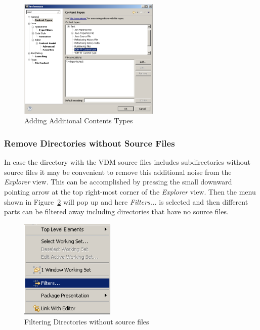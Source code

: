\documentclass{overturerep}
\begin{document}
{\begin{figure}[!htb]
\begin{center}
\includegraphics[width=0.6\textwidth]{screenDumps/contentstypes}
\caption{Adding Additional Contents Types\label{fig:ContentsTypes}}
\end{center}
\end{figure}

\subsubsection{Remove Directories without Source Files}

In case the directory with the VDM source files includes
subdirectories without source files it may be convenient to remove
this additional noise from the \emph{Explorer} view. This can be
accomplished by pressing the small downward pointing arrow at the top
right-most corner of the \emph{Explorer} view. Then the menu shown in
Figure~\ref{fig:filteringfiles} will pop up and here \emph{Filters...}
is selected and then different parts can be filtered away including
directories that have no source files.

\begin{figure}[!htb]
\begin{center}
\includegraphics[width=0.4\textwidth]{screenDumps/filteringfiles}
\caption{Filtering Directories without source files\label{fig:filteringfiles}}
\end{center}
\end{figure}

}
\end{document}
